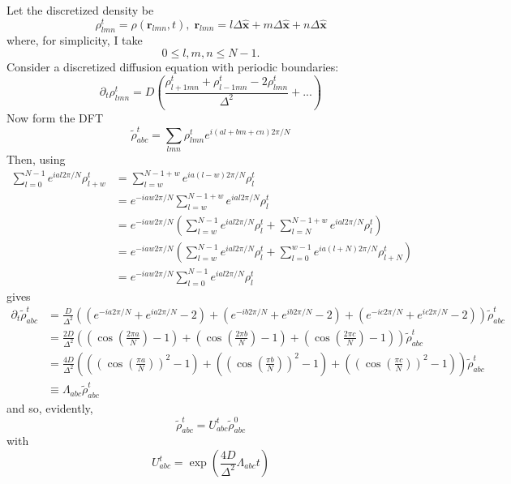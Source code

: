 \documentclass[aps,preprint]{revtex4-1}%
\begin{document}
Let the discretized density be%
\begin{equation}
\rho_{lmn}^{t}=\rho\left(  \mathbf{r}_{lmn},t\right)  ,\;\mathbf{r}%
_{lmn}=l\Delta\widehat{\mathbf{x}}+m\Delta\widehat{\mathbf{x}}+n\Delta
\widehat{\mathbf{x}}%
\end{equation}
where, for simplicity, I take
\begin{equation}
0\leq l,m,n\leq N-1.
\end{equation}
Consider a discretized diffusion equation with periodic boundaries:%
\begin{equation}
\partial_{t}\rho_{lmn}^{t}=D\left(  \frac{\rho_{l+1mn}^{t}+\rho_{l-1mn}%
^{t}-2\rho_{lmn}^{t}}{\Delta^{2}}+...\right)
\end{equation}
Now form the DFT%
\begin{equation}
\widetilde{\rho}_{abc}^{t}=\sum_{lmn}\rho_{lmn}^{t}e^{i\left(
al+bm+cn\right)  2\pi/N}%
\end{equation}
Then, using%
\begin{align*}
\sum_{l=0}^{N-1}e^{ial2\pi/N}\rho_{l+w}^{t}  & =\sum_{l=w}^{N-1+w}e^{ia\left(
l-w\right)  2\pi/N}\rho_{l}^{t}\\
& =e^{-iaw2\pi/N}\sum_{l=w}^{N-1+w}e^{ial2\pi/N}\rho_{l}^{t}\\
& =e^{-iaw2\pi/N}\left(  \sum_{l=w}^{N-1}e^{ial2\pi/N}\rho_{l}^{t}+\sum
_{l=N}^{N-1+w}e^{ial2\pi/N}\rho_{l}^{t}\right)  \\
& =e^{-iaw2\pi/N}\left(  \sum_{l=w}^{N-1}e^{ial2\pi/N}\rho_{l}^{t}+\sum
_{l=0}^{w-1}e^{ia\left(  l+N\right)  2\pi/N}\rho_{l+N}^{t}\right)  \\
& =e^{-iaw2\pi/N}\sum_{l=0}^{N-1}e^{ial2\pi/N}\rho_{l}^{t}%
\end{align*}
gives%
\begin{align}
\partial_{t}\widetilde{\rho}_{abc}^{t}  & =\frac{D}{\Delta^{2}}\left(  \left(
e^{-ia2\pi/N}+e^{ia2\pi/N}-2\right)  +\left(  e^{-ib2\pi/N}+e^{ib2\pi
/N}-2\right)  +\left(  e^{-ic2\pi/N}+e^{ic2\pi/N}-2\right)  \right)
\widetilde{\rho}_{abc}^{t}\\
& =\frac{2D}{\Delta^{2}}\left(  \left(  \cos\left(  \frac{2\pi a}{N}\right)
-1\right)  +\left(  \cos\left(  \frac{2\pi b}{N}\right)  -1\right)  +\left(
\cos\left(  \frac{2\pi c}{N}\right)  -1\right)  \right)  \widetilde{\rho
}_{abc}^{t}\nonumber\\
& =\frac{4D}{\Delta^{2}}\left(  \left(  \left(  \cos\left(  \frac{\pi a}%
{N}\right)  \right)  ^{2}-1\right)  +\left(  \left(  \cos\left(  \frac{\pi
b}{N}\right)  \right)  ^{2}-1\right)  +\left(  \left(  \cos\left(  \frac{\pi
c}{N}\right)  \right)  ^{2}-1\right)  \right)  \widetilde{\rho}_{abc}%
^{t}\nonumber\\
& \equiv\Lambda_{abc}\widetilde{\rho}_{abc}^{t}%
\end{align}
and so, evidently,
\begin{equation}
\widetilde{\rho}_{abc}^{t}=U_{abc}^{t}\widetilde{\rho}_{abc}^{0}%
\end{equation}
with%
\begin{equation}
U_{abc}^{t}=\exp\left(  \frac{4D}{\Delta^{2}}\Lambda_{abc}t\right)
\end{equation}
\end{document}
